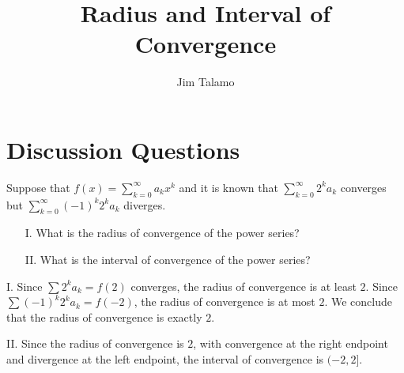 \documentclass[]{ximera}
\author{Jim Talamo}
\title[handout]{Radius and Interval of Convergence}
\begin{document}
\begin{abstract}
\end{abstract}
\maketitle

\vspace{-0.9in}

\section{Discussion Questions}

\begin{problem} 
Suppose that $f(x) = \sum_{k=0}^{\infty} a_k x^k$ and it is known that $\sum_{k=0}^{\infty} 2^k a_k $ converges but $ \sum_{k=0}^{\infty} (-1)^k 2^k a_k $ diverges.

\begin{itemize}
\item[I.] What is the radius of convergence of the power series?
\item[II.] What is the interval of convergence of the power series?
\end{itemize}

\begin{solution}
I. Since $\sum 2^k a_k = f(2)$ converges, the radius of convergence is at least $2$. Since $\sum (-1)^k 2^k a_k = f(-2)$, the radius of convergence is at most $2$. We conclude that the radius of convergence is exactly $2$.

II. Since the radius of convergence is $2$, with convergence at the right endpoint and divergence at the left endpoint, the interval of convergence is $(-2,2]$. 
\end{solution}
\end{problem}
\end{document}
